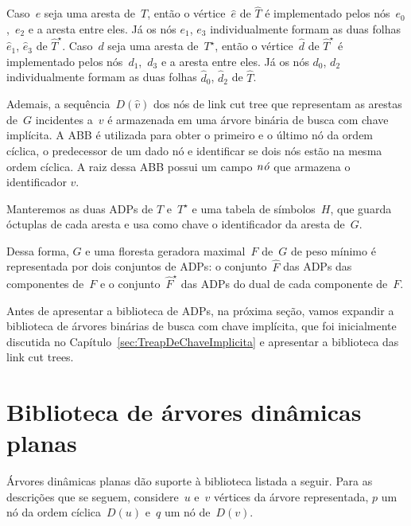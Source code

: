 Caso~$e$ seja uma aresta de~$T$, então o vértice~$\hat e$ de $\hat T$ é implementado pelos nós~$e_0$,~$e_2$ e a aresta entre eles.
Já os nós $e_1$, $e_3$ individualmente formam as duas folhas $\hat e_1$, $\hat e_3$ de $\hat T^\star$.
Caso~$d$ seja uma aresta de~$T^\star$, então o vértice~$\hat d$ de $\hat T^\star$ é implementado pelos nós~$d_1$,~$d_3$ e a aresta entre eles.
Já os nós $d_0$, $d_2$ individualmente formam as duas folhas $\hat d_0$, $\hat d_2$ de $\hat T$.

Ademais, a sequência~$D(\hat v)$ dos nós de link cut tree que representam as arestas de~$G$ incidentes a~$v$ é armazenada em uma árvore binária de busca com chave implícita.
A ABB é utilizada para obter o primeiro e o último nó da ordem cíclica, o predecessor de um dado nó e identificar se dois nós estão na mesma ordem cíclica.
A raiz dessa ABB possui um campo $\mathit{n\acute{o}}$ que armazena o identificador $v$.

Manteremos as duas ADPs de $T$ e~$T^\star$ e uma tabela de símbolos~$H$, que guarda óctuplas de cada aresta e usa como chave o identificador da aresta de~$G$.


Dessa forma, $G$ e uma floresta geradora maximal~$F$ de~$G$ de peso mínimo é representada por dois conjuntos de ADPs: o conjunto~$\hat F$ das ADPs das componentes de~$F$ e o conjunto~$\hat F^\star$ das ADPs do dual de cada componente de~$F$.

Antes de apresentar a biblioteca de ADPs, na próxima seção, vamos expandir a biblioteca de árvores binárias de busca com chave implícita, que foi inicialmente discutida no Capítulo~\ref{sec:TreapDeChaveImplicita} e apresentar a biblioteca das link cut trees.


\section{Biblioteca de árvores dinâmicas planas}
\label{sec:EODT}

Árvores dinâmicas planas dão suporte à biblioteca listada a seguir.
Para as descrições que se seguem, considere~$u$ e~$v$ vértices da árvore representada,
$p$ um nó da ordem cíclica~$D(u)$ e~$q$ um nó de~$D(v)$.

